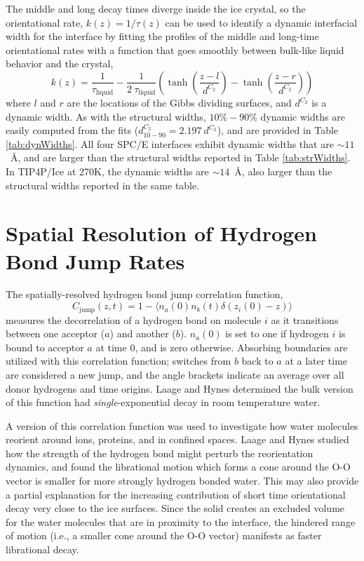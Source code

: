 The middle and long decay times diverge inside the ice crystal, so the
orientational rate, $k(z) = 1 / \tau(z)$ can be used to identify a
dynamic interfacial width for the interface by fitting the profiles of
the middle and long-time orientational rates with a function that goes
smoothly between bulk-like liquid behavior and the crystal,
\begin{equation}\label{tauFit}
  k(z) = \frac{1}{\tau_\mathrm{liquid}} - \frac{1}{2~\tau_\mathrm{liquid}} \left(
      \tanh \left( \frac{z-l}{d^{C_2}} \right) - \tanh \left( \frac{z-r}{d^{C_2}} \right) \right)
\end{equation}
where $l$ and $r$ are the locations of the Gibbs dividing surfaces,
and $d^{C_2}$ is a dynamic width.  As with the structural widths,
$10\%-90\%$ dynamic widths are easily computed from the fits
($d_\mathrm{10-90}^{C_2} = 2.197~d^{C_2}$), and are provided in Table
\ref{tab:dynWidths}. All four SPC/E interfaces exhibit dynamic widths
that are $\sim 11$~\AA, and are larger than the structural widths
reported in Table \ref{tab:strWidths}.  In TIP4P/Ice at 270K, the dynamic widths are
$\sim 14$~\AA, also larger than the structural widths reported in the
same table.
 
\section{Spatial Resolution of Hydrogen Bond Jump Rates}
The spatially-resolved hydrogen bond jump correlation function,
\begin{equation}\label{jump}
C_\mathrm{jump}(z,t) = 1 - \langle n_a(0) n_b(t) \delta(z_i(0) - z) \rangle
\end{equation}
measures the decorrelation of a hydrogen bond on molecule $i$ as it
transitions between one acceptor ($a$) and another ($b$). $n_a(0)$ is
set to one if hydrogen $i$ is bound to acceptor $a$ at time $0$, and
is zero otherwise.  Absorbing boundaries are utilized with this
correlation function; switches from $b$ back to $a$ at a later time
are considered a new jump, and the angle brackets indicate an average
over all donor hydrogens and time origins. Laage and Hynes determined
the bulk version of this function had \textit{single}-exponential
decay in room temperature water.

A version of this correlation function was used to investigate how
water molecules reorient around
ions\cite{Laage2007,Laage2008a,Stirnemann2011a,Laage2011},
proteins\cite{Duboue-Dijon2014}, and in confined
spaces\cite{Laage2012b,Fogarty2014}.  Laage and Hynes studied how the
strength of the hydrogen bond might perturb the reorientation
dynamics,\cite{Laage2006a} and found the librational motion which
forms a cone around the O-O vector is smaller for more strongly
hydrogen bonded water. This may also provide a partial explanation for
the increasing contribution of short time orientational decay very
close to the ice surfaces.  Since the solid creates an excluded volume
for the water molecules that are in proximity to the interface, the
hindered range of motion (i.e., a smaller cone around the O-O vector)
manifests as faster librational decay.

